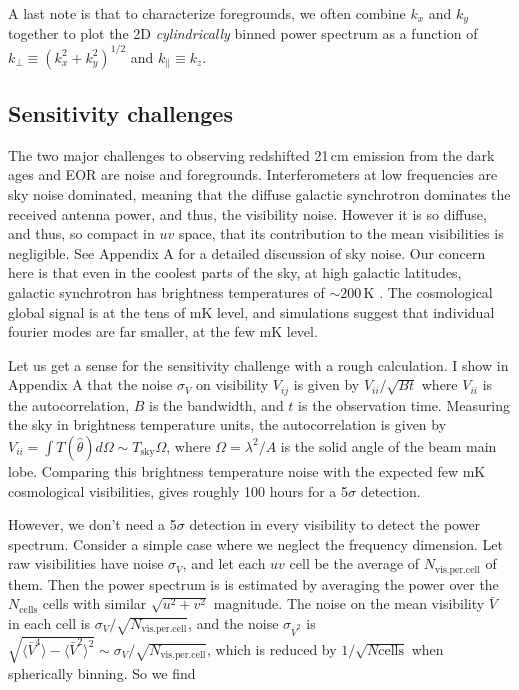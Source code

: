 A last note is that to characterize foregrounds, we often combine $k_x$ and $k_y$ together to plot the 2D \textit{cylindrically} binned power spectrum as a function of $k_\perp\equiv(k_x^2+k_y^2)^{1/2}$ and $k_\parallel\equiv k_z$.




\subsection{Sensitivity challenges}
\label{sec:sensitivity}

The two major challenges to observing redshifted 21\,cm emission from the dark ages and EOR are noise and foregrounds. Interferometers at low frequencies are sky noise dominated, meaning that the diffuse galactic synchrotron dominates the received antenna power, and thus, the visibility noise. However it is so diffuse, and thus, so compact in $uv$ space, that its contribution to the mean visibilities is negligible. See Appendix A for a detailed discussion of sky noise. Our concern here is that even in the coolest parts of the sky, at high galactic latitudes, galactic synchrotron has brightness temperatures of $\sim200$\,K \citep{Tsysmemo}. The cosmological global signal is at the tens of mK level, and simulations suggest that individual fourier modes are far smaller, at the few mK level. 

Let us get a sense for the sensitivity challenge with a rough calculation. I show in Appendix A that the noise $\sigma_V$ on visibility $V_{ij}$ is given by $V_{ii}/\sqrt{Bt}$ where $V_{ii}$ is the autocorrelation, $B$ is the bandwidth, and $t$ is the observation time. Measuring the sky in brightness temperature units, the autocorrelation is given by $V_{ii}=\int T(\hat\theta)d\Omega\sim T_\text{sky}\Omega$, where $\Omega=\lambda^2/A$ is the solid angle of the beam main lobe. Comparing this brightness temperature noise with the expected few mK cosmological visibilities, gives roughly 100 hours for a 5$\sigma$ detection. 

However, we don't need a 5$\sigma$ detection in every visibility to detect the power spectrum. Consider a simple case where we neglect the frequency dimension. Let raw visibilities have noise $\sigma_V$, and let each $uv$ cell be the average of $N_\text{vis.per.cell}$ of them. Then the power spectrum is is estimated by averaging the power over the $N_\text{cells}$ cells with similar $\sqrt{u^2+v^2}$ magnitude. The noise on the mean visibility $\bar{V}$ in each cell is $\sigma_V/\sqrt{N_\text{vis.per.cell}}$, and the noise $\sigma_{\bar V^2}$ is $\sqrt{\langle\bar V^4\rangle-\langle\bar V^2\rangle^2}\sim\sigma_V/\sqrt{N_\text{vis.per.cell}}$, which is reduced by $1/\sqrt{N\text{cells}}$ when spherically binning. So we find 

